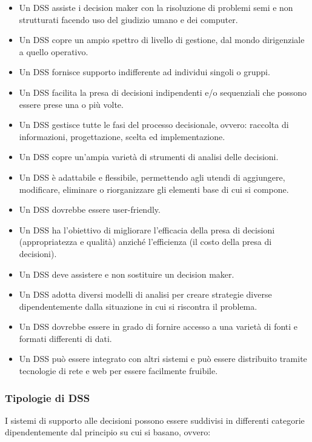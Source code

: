 \begin{itemize}
    \item Un DSS assiste i decision maker con la risoluzione di problemi semi e non strutturati facendo uso del giudizio umano e dei computer.
    \item Un DSS copre un ampio spettro di livello di gestione, dal mondo dirigenziale a quello operativo.
    \item Un DSS fornisce supporto indifferente ad individui singoli o gruppi.
    \item Un DSS facilita la presa di decisioni indipendenti e/o sequenziali che possono essere prese una o più volte.
    \item Un DSS gestisce tutte le fasi del processo decisionale, ovvero: raccolta di informazioni, progettazione, scelta ed implementazione.
    \item Un DSS copre un'ampia varietà di strumenti di analisi delle decisioni.
    \item Un DSS è adattabile e flessibile, permettendo agli utendi di aggiungere, modificare, eliminare o riorganizzare gli elementi base di cui si compone.
    \item Un DSS dovrebbe essere user-friendly.
    \item Un DSS ha l'obiettivo di migliorare l'efficacia della presa di decisioni (appropriatezza e qualità) anziché l'efficienza (il costo della presa di decisioni).
    \item Un DSS deve assistere e non sostituire un decision maker.
    \item Un DSS adotta diversi modelli di analisi per creare strategie diverse dipendentemente dalla situazione in cui si riscontra il problema.
    \item Un DSS dovrebbe essere in grado di fornire accesso a una varietà di fonti e formati differenti di dati.
    \item Un DSS può essere integrato con altri sistemi e può essere distribuito tramite tecnologie di rete e web per essere facilmente fruibile.
\end{itemize}

\subsubsection{Tipologie di DSS}

I sistemi di supporto alle decisioni possono essere suddivisi in differenti categorie dipendentemente dal principio su cui si basano, ovvero:\cite{techtarget_dss_types}

